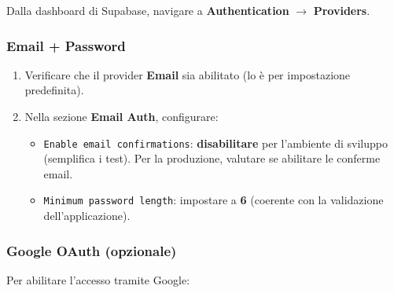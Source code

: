 \documentclass[a4paper,11pt,oneside]{book}
\newcommand{\campo}[1]{\texttt{#1}}
\begin{document}
Dalla dashboard di Supabase, navigare a \textbf{Authentication} $\rightarrow$ \textbf{Providers}.

\subsubsection{Email + Password}

\begin{enumerate}[leftmargin=1.5em]
  \item Verificare che il provider \textbf{Email} sia abilitato (lo \`e per impostazione predefinita).
  \item Nella sezione \textbf{Email Auth}, configurare:
    \begin{itemize}
      \item \campo{Enable email confirmations}: \textbf{disabilitare} per l'ambiente di sviluppo (semplifica i test). Per la produzione, valutare se abilitare le conferme email.
      \item \campo{Minimum password length}: impostare a \textbf{6} (coerente con la validazione dell'applicazione).
    \end{itemize}
\end{enumerate}

\subsubsection{Google OAuth (opzionale)}

Per abilitare l'accesso tramite Google:
\end{document}
